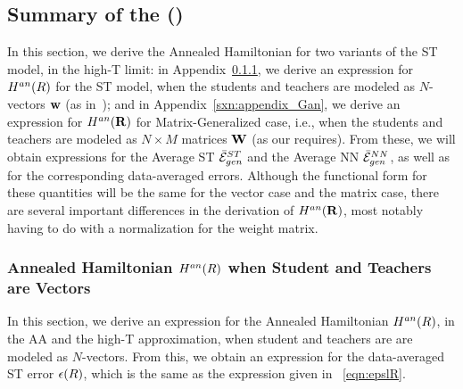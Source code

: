 \subsection{Summary of the \StatisticalMechanicsOfGeneralization (\SMOG)}
\label{sxn:summary_sst92}


In this section, we derive the Annealed Hamiltonian for two variants of the ST model, in the high-T limit:
in Appendix~\ref{app:st-gen-err-annealed-ham}, we derive an expression for $H^{an}(R)$ for the ST \Perceptron model, when the students and teachers are modeled as $N$-vectors ${\mathbf{w}}$ (as in~\cite{SST92}); and
in Appendix~\ref{sxn:appendix_Gan}, we derive an expression for $H^{an}(\mathbf{R})$ for Matrix-Generalized case, i.e., when the students and teachers are modeled as $N \times M$ matrices ${\mathbf{W}}$ (as our \SETOL requires).
From these, we will obtain expressions for the Average ST \ModelGeneralizationError $\bar{\mathcal{E}}^{ST}_{gen}$ and the Average NN \ModelGeneralizationError $\bar{\mathcal{E}}^{NN}_{gen}$, as well as for the corresponding data-averaged errors.
Although the functional form for these quantities will be the same for the vector case and the matrix case, there are several important differences in the derivation of $H^{an}(\mathbf{R})$, most notably having to do with a normalization for the weight matrix. 


\subsubsection{Annealed Hamiltonian \texorpdfstring{$H^{an}(R)$}{H(R)} when Student and Teachers are Vectors}
\label{app:st-gen-err-annealed-ham}

In this section, we derive an expression for the Annealed Hamiltonian $H^{an}(R)$, 
in the AA and the high-T approximation,
when student and teachers are are modeled as $N$-vectors.
%
From this, we obtain an expression for the data-averaged ST error $\epsilon(R)$, 
which is the same as the expression given in \EQN~\ref{eqn:epslR}.

